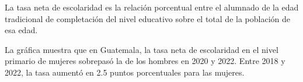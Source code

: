 La tasa neta de escolaridad es la relación porcentual entre el alumnado de la edad tradicional de completación del nivel educativo sobre el total de la población de esa edad.

La gráfica muestra que en Guatemala, la tasa neta de escolaridad en el nivel primario de mujeres sobrepasó la de los hombres en 2020 y 2022. Entre 2018 y 2022, la tasa aumentó en
2.5 puntos porcentuales para las mujeres.